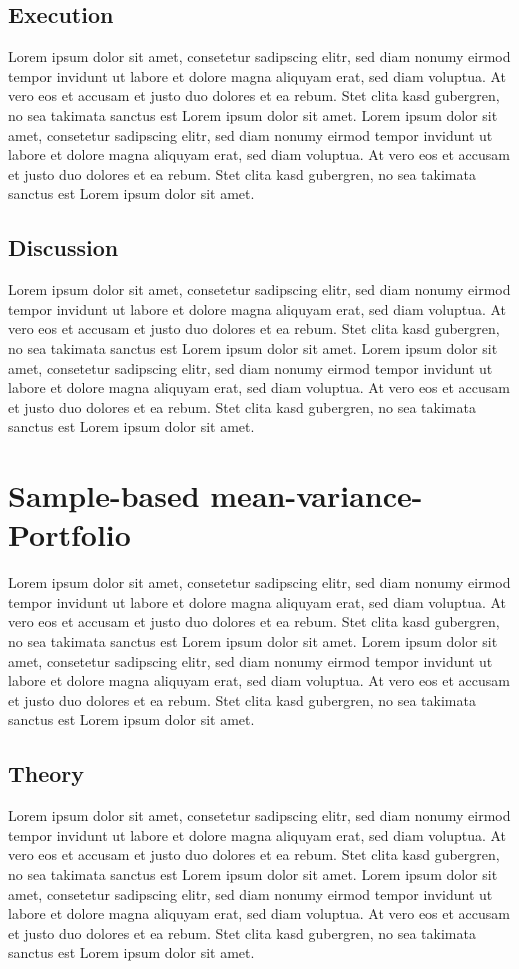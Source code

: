 \subsection{Execution}
Lorem ipsum dolor sit amet, consetetur sadipscing elitr, sed diam nonumy eirmod tempor invidunt ut labore et dolore magna aliquyam erat, sed diam voluptua. At vero eos et accusam et justo duo dolores et ea rebum. Stet clita kasd gubergren, no sea takimata sanctus est Lorem ipsum dolor sit amet. Lorem ipsum dolor sit amet, consetetur sadipscing elitr, sed diam nonumy eirmod tempor invidunt ut labore et dolore magna aliquyam erat, sed diam voluptua. At vero eos et accusam et justo duo dolores et ea rebum. Stet clita kasd gubergren, no sea takimata sanctus est Lorem ipsum dolor sit amet.
\subsection{Discussion}
Lorem ipsum dolor sit amet, consetetur sadipscing elitr, sed diam nonumy eirmod tempor invidunt ut labore et dolore magna aliquyam erat, sed diam voluptua. At vero eos et accusam et justo duo dolores et ea rebum. Stet clita kasd gubergren, no sea takimata sanctus est Lorem ipsum dolor sit amet. Lorem ipsum dolor sit amet, consetetur sadipscing elitr, sed diam nonumy eirmod tempor invidunt ut labore et dolore magna aliquyam erat, sed diam voluptua. At vero eos et accusam et justo duo dolores et ea rebum. Stet clita kasd gubergren, no sea takimata sanctus est Lorem ipsum dolor sit amet.

\section{Sample-based mean-variance-Portfolio}
Lorem ipsum dolor sit amet, consetetur sadipscing elitr, sed diam nonumy eirmod tempor invidunt ut labore et dolore magna aliquyam erat, sed diam voluptua. At vero eos et accusam et justo duo dolores et ea rebum. Stet clita kasd gubergren, no sea takimata sanctus est Lorem ipsum dolor sit amet. Lorem ipsum dolor sit amet, consetetur sadipscing elitr, sed diam nonumy eirmod tempor invidunt ut labore et dolore magna aliquyam erat, sed diam voluptua. At vero eos et accusam et justo duo dolores et ea rebum. Stet clita kasd gubergren, no sea takimata sanctus est Lorem ipsum dolor sit amet.
\subsection{Theory}
Lorem ipsum dolor sit amet, consetetur sadipscing elitr, sed diam nonumy eirmod tempor invidunt ut labore et dolore magna aliquyam erat, sed diam voluptua. At vero eos et accusam et justo duo dolores et ea rebum. Stet clita kasd gubergren, no sea takimata sanctus est Lorem ipsum dolor sit amet. Lorem ipsum dolor sit amet, consetetur sadipscing elitr, sed diam nonumy eirmod tempor invidunt ut labore et dolore magna aliquyam erat, sed diam voluptua. At vero eos et accusam et justo duo dolores et ea rebum. Stet clita kasd gubergren, no sea takimata sanctus est Lorem ipsum dolor sit amet.
